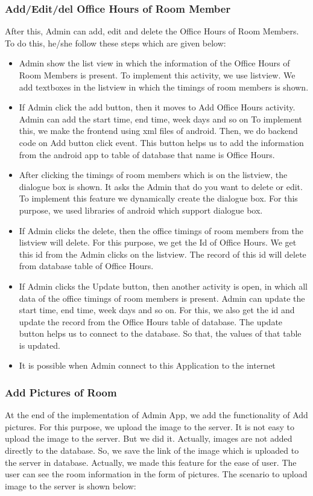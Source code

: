 \subsubsection{Add/Edit/del Office Hours of Room Member}
 After this, Admin can add, edit and delete the Office Hours of Room Members. To do this,     he/she follow these steps which are given below: 
\begin{itemize}
\item Admin show the list view in which the information of the Office Hours of Room Members is present. To implement this activity, we use listview. We add textboxes in the listview in which the timings of room members is shown.
\item If Admin click the add button, then it moves to Add Office Hours activity. Admin can add the start time, end time, week days and so on To implement this, we make the frontend using xml files of android. Then, we do backend code on Add button click event. This button helps us to add the information from the android app to table of database that name is Office Hours. 
\item After clicking the timings of room members which is on the listview, the dialogue box is shown. It asks the Admin that do you want to delete or edit. To implement this feature we dynamically create the dialogue box. For this purpose, we used libraries of android which support dialogue box. 
\item If Admin clicks the delete, then the office timings of room members from the listview will delete. For this purpose, we get the Id of Office Hours. We get this id from the Admin clicks on the listview. The record of this id will delete from database table of Office Hours.
\item If Admin clicks the Update button, then another activity is open, in which all data of the office timings of room members is present. Admin can update the start time, end time, week days and so on. For this, we also get the id and update the record from the Office Hours table of database. The update button helps us to connect to the database. So that, the values of that table is updated.
\item It is possible when Admin connect to this Application to the internet
\end{itemize}


\subsubsection{Add Pictures of Room}
At the end of the implementation of Admin App, we add the functionality of Add pictures. For this purpose, we upload the image to the server. It is not easy to upload the image to the server. But we did it. Actually, images are not added directly to the database. So, we save the link of the image which is uploaded to the server in database. Actually, we made this feature for the ease of user. The user can see the room information in the form of pictures. The scenario to upload image to the server is shown below:

